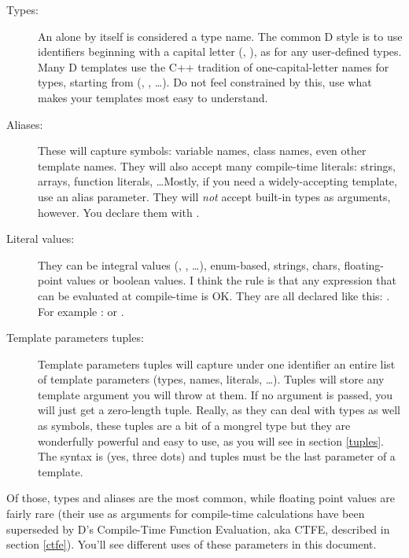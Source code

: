 \begin{description}

\item[Types:] 

An  alone by itself is considered a type name. The common D style is to use identifiers beginning with a capital letter (, ), as for any user-defined types. Many D templates use the C++ tradition of one-capital-letter names for types, starting from  (, , \ldots). Do not feel constrained by this, use what makes your templates most easy to understand.

\item[Aliases: ] 

These will capture symbols: variable names, class names, even other template names. They will also accept many compile-time literals: strings, arrays, function literals, \ldots Mostly, if you need a widely-accepting template, use an alias parameter. They will \emph{not} accept built-in types as arguments, however. You declare them with  .

\item[Literal values:] 

They can be integral values (, , \ldots), enum-based, strings, chars, floating-point values or boolean values. I think the rule is that any expression that can be evaluated at compile-time is OK. They are all declared like this:  . For example :   or  .

\item[Template parameters tuples:] 

Template parameters tuples will capture un\-der one id\-en\-ti\-fier an en\-ti\-re list of tem\-plate pa\-ra\-me\-ters (types, names, literals, \ldots). Tuples will store any template argument you will throw at them. If no argument is passed, you will just get a zero-length tuple. Really, as they can deal with types as well as symbols, these tuples are a bit of a mongrel type but they are wonderfully powerful and easy to use, as you will see in section \ref{tuples}. The syntax is  (yes, three dots) and tuples must be the last parameter of a template. 
\end{description}

Of those, types and aliases are the most common, while floating point values are fairly rare (their use as arguments for compile-time calculations have been superseded by D's Compile-Time Function Evaluation, aka CTFE, described in section \ref{ctfe}). You'll see different uses of these parameters in this document.

